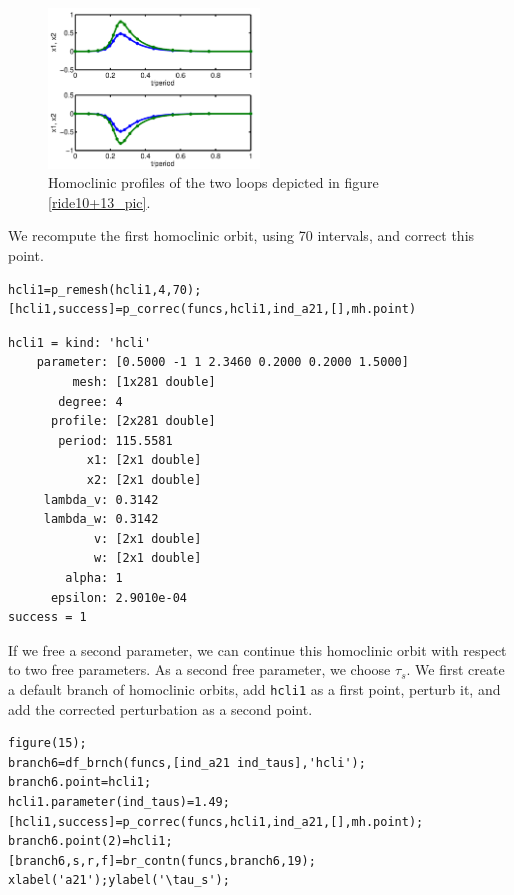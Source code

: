 \documentclass[10pt]{scrartcl}
\begin{document}
\begin{figure}[h]
\begin{center}
\includegraphics[width=0.5\textwidth]{fig/demo1fig14}
\end{center}
\caption{\label{ride14_pic}Homoclinic profiles of the two loops
depicted in figure \ref{ride10+13_pic}.}
\end{figure}
We recompute the first homoclinic orbit, using 70 intervals, and correct this point.
\begin{lstlisting}
hcli1=p_remesh(hcli1,4,70);
[hcli1,success]=p_correc(funcs,hcli1,ind_a21,[],mh.point)
\end{lstlisting}
{\small
\begin{verbatim}
hcli1 = kind: 'hcli'
    parameter: [0.5000 -1 1 2.3460 0.2000 0.2000 1.5000]
         mesh: [1x281 double]
       degree: 4
      profile: [2x281 double]
       period: 115.5581
           x1: [2x1 double]
           x2: [2x1 double]
     lambda_v: 0.3142
     lambda_w: 0.3142
            v: [2x1 double]
            w: [2x1 double]
        alpha: 1
      epsilon: 2.9010e-04
success = 1
\end{verbatim}}
If we free a second parameter, we can continue this homoclinic orbit with 
respect to two free parameters.  As a second free parameter, 
we choose $\tau_s$. We first create a default branch of homoclinic orbits,
add \verb#hcli1# as a first point, perturb it, and add the corrected
perturbation as a second point.
\begin{lstlisting}
figure(15);
branch6=df_brnch(funcs,[ind_a21 ind_taus],'hcli');
branch6.point=hcli1;
hcli1.parameter(ind_taus)=1.49;
[hcli1,success]=p_correc(funcs,hcli1,ind_a21,[],mh.point);
branch6.point(2)=hcli1;
[branch6,s,r,f]=br_contn(funcs,branch6,19);
xlabel('a21');ylabel('\tau_s');  
\end{lstlisting}
\end{document}
